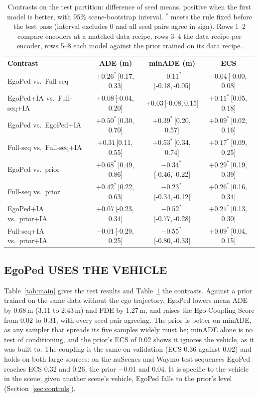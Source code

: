 \documentclass{ieeeoj}
\newcommand{\method}{EgoPed\xspace}
\newcommand{\fullseq}{Full-seq\xspace}
\newcommand{\ci}[2]{\,{\scriptsize[#1,\,#2]}}
\begin{document}
\begin{table}[t]
  \centering
  \caption{Contrasts on the test partition: difference of seed means, positive when the first model is better, with 95\% scene-bootstrap interval. $^\ast$ meets the rule fixed before the test pass (interval excludes 0 and all seed pairs agree in sign). Rows 1--2 compare encoders at a matched data recipe, rows 3--4 the data recipe per encoder, rows 5--8 each model against the prior trained on its data recipe.}
  \label{tab:contrasts}
  \vspace{4pt}
  \small
  \setlength{\tabcolsep}{8pt}
  \begin{tabular}{lccc}
    \toprule
    Contrast & ADE (m) & minADE (m) & ECS \\
    \midrule
    \method vs.\ \fullseq & $+0.26^\ast$\ci{0.17}{0.33} & $-0.11^\ast$\ci{-0.18}{-0.05} & $+0.04$\ci{-0.00}{0.08} \\
    \method+IA vs.\ \fullseq+IA & $+0.08$\ci{-0.04}{0.20} & $+0.03$\ci{-0.08}{0.15} & $+0.11^\ast$\ci{0.05}{0.18} \\
    \method vs.\ \method+IA & $+0.50^\ast$\ci{0.30}{0.70} & $+0.39^\ast$\ci{0.20}{0.57} & $+0.09^\ast$\ci{0.02}{0.16} \\
    \fullseq vs.\ \fullseq+IA & $+0.31$\ci{0.11}{0.55} & $+0.53^\ast$\ci{0.34}{0.74} & $+0.17^\ast$\ci{0.09}{0.25} \\
    \method vs.\ prior & $+0.68^\ast$\ci{0.49}{0.86} & $-0.34^\ast$\ci{-0.46}{-0.22} & $+0.29^\ast$\ci{0.19}{0.39} \\
    \fullseq vs.\ prior & $+0.42^\ast$\ci{0.22}{0.63} & $-0.23^\ast$\ci{-0.34}{-0.12} & $+0.26^\ast$\ci{0.16}{0.34} \\
    \method+IA vs.\ prior+IA & $+0.07$\ci{-0.23}{0.34} & $-0.52^\ast$\ci{-0.77}{-0.28} & $+0.21^\ast$\ci{0.13}{0.30} \\
    \fullseq+IA vs.\ prior+IA & $-0.01$\ci{-0.29}{0.25} & $-0.55^\ast$\ci{-0.80}{-0.33} & $+0.09^\ast$\ci{0.04}{0.15} \\
    \bottomrule
  \end{tabular}
\end{table}

\subsection{\method USES THE VEHICLE}
\label{sec:main}

Table~\ref{tab:main} gives the test results and Table~\ref{tab:contrasts} the contrasts.
Against a prior trained on the same data without the ego trajectory, \method lowers mean ADE by 0.68\,m (3.11 to 2.43\,m) and FDE by 1.27\,m, and raises the Ego-Coupling Score from 0.02 to 0.31, with every seed pair agreeing.
The prior is better on minADE, as any sampler that spreads its five samples widely must be; minADE alone is no test of conditioning, and the prior's ECS of 0.02 shows it ignores the vehicle, as it was built to.
The coupling is the same on validation (ECS 0.36 against 0.02) and holds on both large sources: on the nuScenes and Waymo test sequences \method reaches ECS 0.32 and 0.26, the prior $-$0.01 and 0.04. It is specific to the vehicle in the scene: given another scene's vehicle, \method falls to the prior's level (Section~\ref{sec:controls}).
\end{document}
